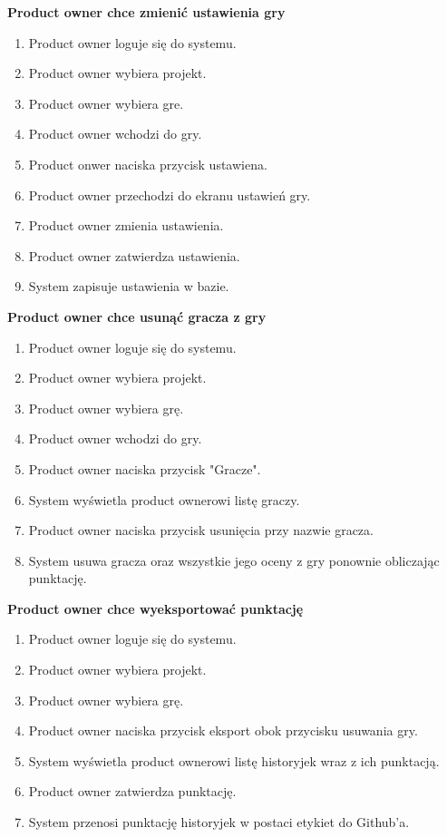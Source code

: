 \textbf{Product owner chce zmienić ustawienia gry}

\begin{enumerate}
    \item Product owner loguje się do systemu.
    \item Product owner wybiera projekt.
    \item Product owner wybiera gre.
    \item Product owner wchodzi do gry.
    \item Product onwer naciska przycisk ustawiena.
    \item Product owner przechodzi do ekranu ustawień gry.
    \item Product owner zmienia ustawienia.
    \item Product owner zatwierdza ustawienia.
    \item System zapisuje ustawienia w bazie.
\end{enumerate}

\textbf{Product owner chce usunąć gracza z gry}

\begin{enumerate}
    \item Product owner loguje się do systemu.
    \item Product owner wybiera projekt.
    \item Product owner wybiera grę.
    \item Product owner wchodzi do gry.
    \item Product owner naciska przycisk "Gracze".
    \item System wyświetla product ownerowi listę graczy.
    \item Product owner naciska przycisk usunięcia przy nazwie gracza.
    \item System usuwa gracza oraz wszystkie jego oceny z gry ponownie obliczając punktację.
\end{enumerate}

\textbf{Product owner chce wyeksportować punktację}

\begin{enumerate}
    \item Product owner loguje się do systemu.
    \item Product owner wybiera projekt.
    \item Product owner wybiera grę.
    \item Product owner naciska przycisk eksport obok przycisku usuwania gry.
    \item System wyświetla product ownerowi listę historyjek wraz z ich punktacją.
    \item Product owner zatwierdza punktację.
    \item System przenosi punktację historyjek w postaci etykiet do Github'a.
\end{enumerate}

